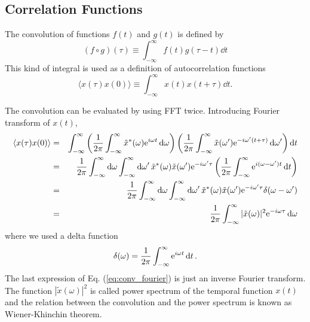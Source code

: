 \subsection{Correlation Functions}

The convolution of functions $f(t)$ and $g(t)$ is defined by
\begin{equation}
(f \circ g) (\tau) \equiv \int_{-\infty}^{\infty} f(t) g(\tau-t) \dd{t}
\end{equation}
This kind of integral is used as a definition of autocorrelation functions
\begin{equation}
\langle x(\tau) x(0) \rangle \equiv \int_{-\infty}^{\infty} x(t) x(t+\tau) \dd{t}.
\end{equation}

The convolution can be evaluated by using FFT twice.
Introducing Fourier transform of $x(t)$,
\begin{eqnarray}
\langle x(\tau) x(0) \rangle &=& \int_{-\infty}^{\infty} \left ( \frac{1}{2\pi}\int_{-\infty}^{\infty} \tilde{x}^*(\omega) \text{e}^{i \omega t} \dd{\omega} \right ) \left ( \frac{1}{2\pi} \int_{-\infty}^{\infty} \tilde{x}(\omega^\prime) \text{e}^{-i \omega^\prime (t+\tau)} \dd{\omega}^\prime \right ) \dd{t} \nonumber\\
&=& \frac{1}{2\pi} \int_{-\infty}^{\infty} \dd{\omega} \int_{-\infty}^{\infty} \dd{\omega}^\prime \tilde{x}^*(\omega)  \tilde{x}(\omega^\prime) \text{e}^{-i \omega^\prime \tau} 
\left (\frac{1}{2\pi} \int_{-\infty}^{\infty} \text{e}^{i(\omega-\omega^\prime) t} \dd{t} \right ) \nonumber\\
&=&
\frac{1}{2\pi}\int_{-\infty}^{\infty} \dd{\omega} \int_{-\infty}^{\infty} \dd{\omega}^\prime \tilde{x}^*(\omega)  \tilde{x}(\omega^\prime) \text{e}^{-i \omega^\prime \tau} 
\delta (\omega-\omega^\prime) \nonumber\\
&=& \frac{1}{2\pi}\int_{-\infty}^{\infty}  
 |\tilde{x}(\omega)|^2 \text{e}^{-i \omega \tau} \dd{\omega}
 \label{eq:conv_fourier}
\end{eqnarray}
where we used a delta function 
\begin{equation}
\delta(\omega) = \frac{1}{2\pi} \int_{-\infty}^{\infty} \text{e}^{i \omega t } \dd{t}.
\end{equation}
The last expression of Eq. (\ref{eq:conv_fourier}) is just an inverse Fourier transform.  The function $|\tilde{x}(\omega)|^2$ is called power spectrum of the temporal function $x(t)$ and the relation between the convolution and the power spectrum is known as Wiener-Khinchin theorem.

